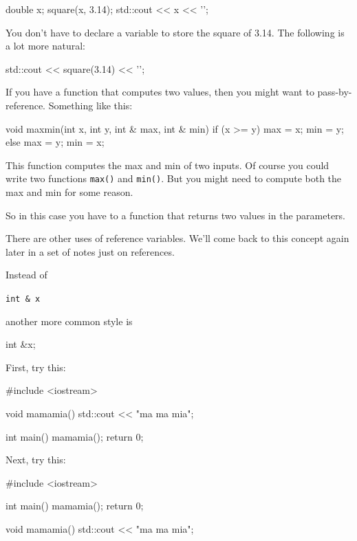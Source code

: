 \begin{consolethree}[escapeinside=||]
double x;
square(x, 3.14);
std::cout << x << '\n';
\end{consolethree}

You don't have to declare a variable to store the square of 3.14. The following is a lot more natural:

\begin{consolethree}[escapeinside=||]
std::cout << square(3.14) << '\n';
\end{consolethree}

If you have a function that computes two values, then you might want to pass-by-reference. Something like this:

\begin{consolethree}[escapeinside=||]
void maxmin(int x, int y, int & max, int & min)
{
    if (x >= y)
    {
        max = x;
        min = y;
    }
    else
    {
        max = y;
        min = x;
    }
}
\end{consolethree}

This function computes the max and min of two inputs. Of course you could write two functions \texttt{max()} and \texttt{min()}. But you might need to compute both the max and min for some reason.

So in this case you have to a function that returns two values in the parameters.

There are other uses of reference variables. We'll come back to this concept again later in a set of notes just on references.


\newpage{}

Instead of

\texttt{int \& x}

another more common style is

int \&x;


\newpage{}

First, try this:

\begin{consolethree}[escapeinside=||]
#include <iostream>

void mamamia()
{
    std::cout << "ma ma mia\n";
}

int main()
{
    mamamia();
    return 0;
}
\end{consolethree}

Next, try this:

\begin{consolethree}[escapeinside=||]
#include <iostream>

int main()
{
    mamamia();
    return 0;
}

void mamamia()
{
    std::cout << "ma ma mia\n";
}
\end{consolethree}

